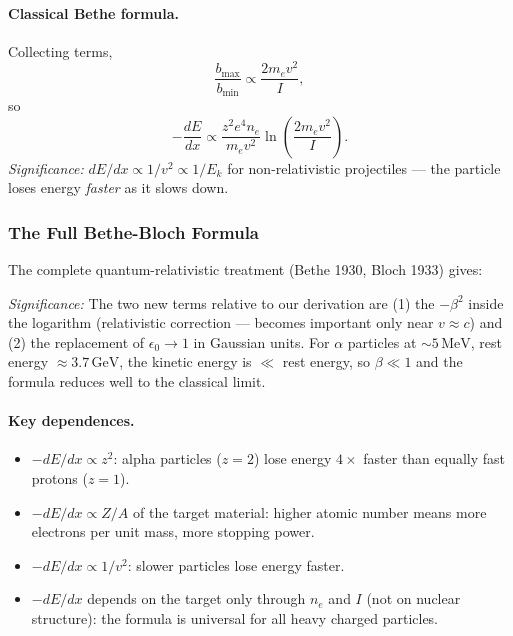 \paragraph{Classical Bethe formula.}
Collecting terms,
\begin{equation}
  \label{eq:lec06:bethe_classical}
  \frac{b_\text{max}}{b_\text{min}}
    \propto \frac{2m_e v^2}{I},
\end{equation}
so
\begin{equation}
  \label{eq:lec06:dEdx_classical}
  \boxed{-\frac{dE}{dx}
    \propto \frac{z^2 e^4 n_e}{m_e v^2}
    \ln\!\left(\frac{2m_e v^2}{I}\right).}
\end{equation}
\textit{Significance:} $dE/dx \propto 1/v^2 \propto 1/E_k$ for non-relativistic
projectiles — the particle loses energy \emph{faster} as it slows down.

\subsubsection*{The Full Bethe-Bloch Formula}

The complete quantum-relativistic treatment (Bethe 1930, Bloch 1933) gives:


\textit{Significance:} The two new terms relative to our derivation are (1) the
$-\beta^2$ inside the logarithm (relativistic correction — becomes important
only near $v\approx c$) and (2) the replacement of $\epsilon_0\to1$ in Gaussian
units.  For $\alpha$ particles at $\sim5\,\text{MeV}$, rest energy $\approx
3.7\,\text{GeV}$, the kinetic energy is $\ll$ rest energy, so $\beta \ll 1$ and
the formula reduces well to the classical limit.

\paragraph{Key dependences.}
\begin{itemize}
  \item $-dE/dx \propto z^2$: alpha particles ($z=2$) lose energy $4\times$ faster
  than equally fast protons ($z=1$).
  \item $-dE/dx \propto Z/A$ of the target material: higher atomic number means
  more electrons per unit mass, more stopping power.
  \item $-dE/dx \propto 1/v^2$: slower particles lose energy faster.
  \item $-dE/dx$ depends on the target only through $n_e$ and $I$ (not on nuclear
  structure): the formula is universal for all heavy charged particles.
\end{itemize}

